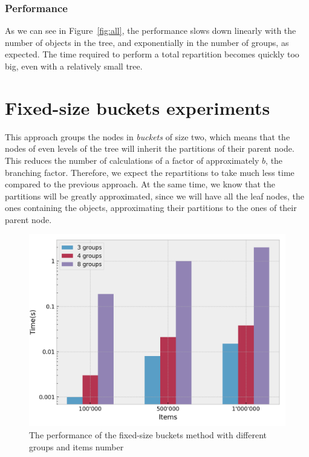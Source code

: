 \subsubsection{Performance}
As we can see in Figure~\ref{fig:all}, the performance slows down linearly with the number of objects in the tree, and exponentially in the number of groups, as expected. The time required to perform a total repartition becomes quickly too big, even with a relatively small tree.

\section{Fixed-size buckets experiments}\label{sec:fixed-size buckets-tests}
This approach groups the nodes in \emph{buckets} of size two, which means that the nodes of even levels of the tree will inherit the partitions of their parent node. This reduces the number of calculations of a factor of approximately $b$, the branching factor. Therefore, we expect the repartitions to take much less time compared to the previous approach. At the same time, we know that the partitions will be greatly approximated, since we will have all the leaf nodes, the ones containing the objects, approximating their partitions to the ones of their parent node.

\begin{figure}[!htb]
  \centering
  \includegraphics[width=\textwidth,height=\textheight,keepaspectratio]{img/fixed.png}
  \caption{The performance of the fixed-size buckets method with different groups and items number}
  \label{fig:fixed}
\end{figure}

